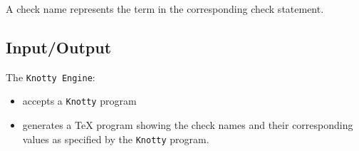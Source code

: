 \documentclass[letterpaper, 12pt]{extarticle}
\theoremstyle{definition} %
\newcommand{\code}[1]{\texttt{#1}}
\newcommand{\kn}{\code{Knotty}}
\newcommand{\kne}{\code{Knotty Engine}}
\newcommand{\tex}{\TeX}
\begin{document}
A check name represents the term
in the corresponding check statement.

\subsection{Input/Output}

The \kne:
\begin{itemize}
\item
accepts a \kn{} program
\item
generates a \tex{} program showing the check names and
their corresponding values 
as specified by the \kn{} program.
\end{itemize}

\end{document}
